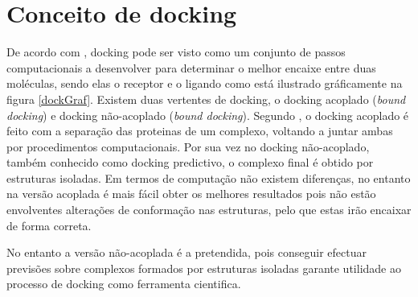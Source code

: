 \section{Conceito de docking}
De acordo com \cite{halperin}, docking pode ser visto como um conjunto de passos computacionais a desenvolver para determinar o melhor encaixe entre duas moléculas, sendo elas o receptor e o ligando como está ilustrado gráficamente na figura \ref{dockGraf}. 
%
Existem duas vertentes de docking, o docking acoplado (\textit{bound docking}) e docking não-acoplado (\textit{bound docking}). Segundo \cite{vakser2014protein}, o docking acoplado é feito com a separação das proteinas de um complexo, voltando a juntar ambas por procedimentos computacionais. Por sua vez no docking não-acoplado, também conhecido como docking predictivo, o complexo final é obtido por estruturas isoladas. Em termos de computação não existem diferenças, no entanto na versão acoplada é mais fácil obter os melhores resultados pois não estão envolventes alterações de conformação nas estruturas, pelo que estas irão encaixar de forma correta.  \par No entanto a versão não-acoplada é a pretendida, pois conseguir efectuar previsões sobre complexos formados por estruturas isoladas garante utilidade ao processo de docking como ferramenta cientifica.
